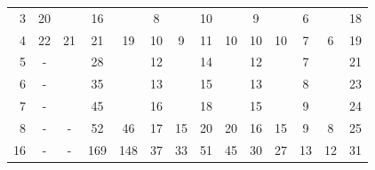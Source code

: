 \documentclass[smallcondensed,final]{svjour3}     %
\begin{document}
\begin{table}
\begin{tabular}{|r|c c|c c|c c||c c|c c|c c||c|}
3 & 20 & & 16 & & 8 & & 10 & & 9 & & 6 & & 18  \\

4 & 22 & 21 & 21 & 19 & 10 & 9 & 11 & 10 & 10 & 10 & 7 & 6 & 19 \\

5 & -  & & 28 & & 12 & & 14 & & 12 & & 7 & & 21   \\

6 & -  & & 35 & & 13 & & 15 & & 13 & & 8 & & 23  \\

7 & -  & & 45 & & 16 & & 18 & & 15 & & 9 & & 24  \\

8 & -  & - & 52 & 46 & 17 & 15 & 20 & 20 & 16 & 15 & 9 & 8 & 25  \\

16 & - & - & 169 & 148 & 37 & 33 & 51 & 45 & 30 & 27 & 13 & 12 & 31 \\

\hline

  \end{tabular}

\end{table}
\end{document}
